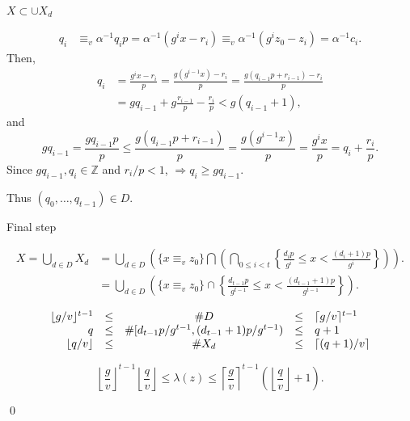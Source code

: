 \begin{frame}{$X \subset \cup X_d$}


  \begin{align*}
    q_i &\equiv_v \alpha^{-1}q_ip  
          = \alpha^{-1}(g^ix - r_i )
          \equiv_v \alpha^{-1}(g^iz_0 - z_i) = \alpha^{-1}c_i.
  \end{align*}
Then,
  \begin{align*}
    q_i &= \frac{g^ix-r_i}{p} = \frac{g(g^{i-1}x)-r_i}{p}
          = \frac{g(q_{i-1}p+r_{i-1}) - r_i}{p} \\
        &= gq_{i-1} + g\frac{r_{i-1}}{p} -\frac{r_i}{p} 
          < g(q_{i-1}+1),
  \end{align*}
and
  \[
  gq_{i-1} = \frac{gq_{i-1}p}{p} \leq \frac{g(q_{i-1}p+r_{i-1})}{p} 
           = \frac{g(g^{i-1}x)}{p} = \frac{g^ix}{p} = q_i + \frac{r_i}{p}.
  \]
Since $gq_{i-1}, q_{i} \in \mathbb{Z}$ and $r_{i}/p < 1$, $\Rightarrow q_{i} \geq g q_{i-1}$.

Thus  $(q_0,\ldots,q_{t-1}) \in D$.


\end{frame}

\begin{frame}{Final step}

  \begin{align*} 
    X = \bigcup_{d \in D}X_d &= \bigcup_{d \in D} \left (\{x \equiv_v z_0 \} \bigcap 
        \left( \bigcap_{0 \leq i < t} \left \{\frac{d_ip}{g^i} 
                               \leq x < \frac{(d_i+1)p}{g^i} \right\} \right) \right). \\
    &=  \bigcup_{d \in D}
    \left (   \{x \equiv_v z_0 \} \cap \left \{\frac{d_{t-1}p}{g^{t-1}} 
    \leq x < \frac{(d_{t-1}+1)p}{g^{t-1}} \right \}\right). 
  \end{align*}

  \[
    \begin{array}{rcccl}
    \lfloor g/v \rfloor^{t-1}  &\leq &\#{D} &\leq& \lceil g/v \rceil^{t-1} \\
    q &\leq &\#{[d_{t-1}p/g^{t-1},(d_{t-1}+1)p/g^{t-1})} &\leq &q+1 \\
      \lfloor q/v \rfloor &\leq& \#{X_d} &\leq& \lceil (q+1)/v \rceil
                            \end{array}
   \]

  \[
     \left \lfloor \frac{g}{v} \right \rfloor^{t-1} 
     \left \lfloor\frac{q}{v} \right \rfloor 
\leq \lambda(z) 
\leq \left \lceil \frac{g}{v} \right \rceil^{t-1} 
     \left(\left \lfloor\frac{q}{v} \right\rfloor +1 \right).
   \]
  
\qed
   
\end{frame}

